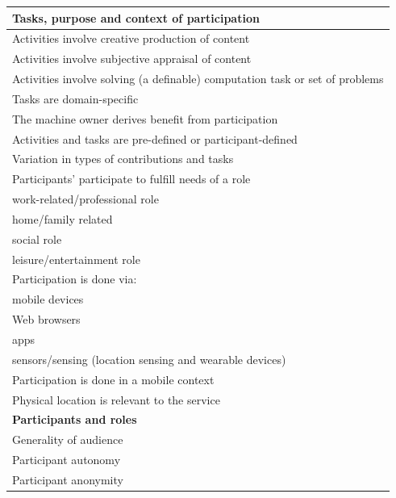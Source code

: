 \documentclass{sig-alternate}
\begin{document}
\begin{table}[htb]
\begin{center}
\begin{scriptsize}
\begin{tabular}{|p{8cm}|}
\hline
{\bf Tasks, purpose and context of participation} \\
\hline
Activities involve creative production of content \\
Activities involve subjective appraisal of content \\
Activities involve solving (a definable) computation task or set of problems\\
Tasks are domain-specific \\
The machine owner derives benefit from participation \\
Activities and tasks are pre-defined or participant-defined \\
Variation in types of contributions and tasks \\
Participants' participate to fulfill needs of a role \\
\hspace{1cm} work-related/professional role \\
\hspace{1cm} home/family related \\
\hspace{1cm} social role \\
\hspace{1cm} leisure/entertainment role \\
Participation is done via: \\
\hspace{1cm} mobile devices \\
\hspace{1cm} Web browsers \\
\hspace{1cm} apps \\
\hspace{1cm} sensors/sensing (location sensing and wearable devices) \\
Participation is done in a mobile context \\
\hspace{1cm} Physical location is relevant to the service \\
\hline
{\bf Participants and roles} \\
\hline
Generality of audience \\
Participant autonomy \\
Participant anonymity \\

\end{tabular}
\end{scriptsize}
\end{center}
\end{table}
\end{document}

